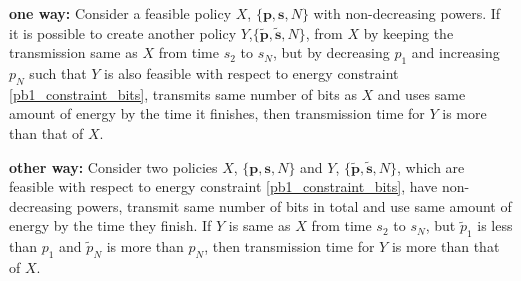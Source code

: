 \begin{lemma}

\textbf{one way:}
Consider a feasible policy $X$, $\{\bm{p},\bm{s},N\}$ with non-decreasing powers. If it is possible to create another policy $Y$,$\{\bm{\widetilde{p}},\bm{\widetilde{s}},N\}$, from $X$ by keeping the transmission same as $X$ from time $s_2$ to $s_{N}$, but by decreasing $p_1$ and increasing $p_N$ such that $Y$ is also feasible with respect to energy constraint \eqref{pb1_constraint_bits}, transmits same number of bits as $X$ and uses same amount of energy by the time it finishes, then transmission time for $Y$ is more than that of $X$.

\textbf{other way:}
Consider two policies $X$, $\{\bm{p},\bm{s},N\}$  and $Y$, $\{\bm{\widetilde{p}},\bm{\widetilde{s}},N\}$, which are feasible with respect to energy constraint \eqref{pb1_constraint_bits}, have non-decreasing powers, transmit same number of bits in total and use same amount of energy by the time they finish. If $Y$ is same as $X$ from time $s_2$ to $s_{N}$, but $\widetilde{p}_1$ is less than $p_1$ and $\widetilde{p}_N$ is more than $p_N$, then transmission time for $Y$ is more than that of $X$.

\label{lemma_increase_time}
\end{lemma}
